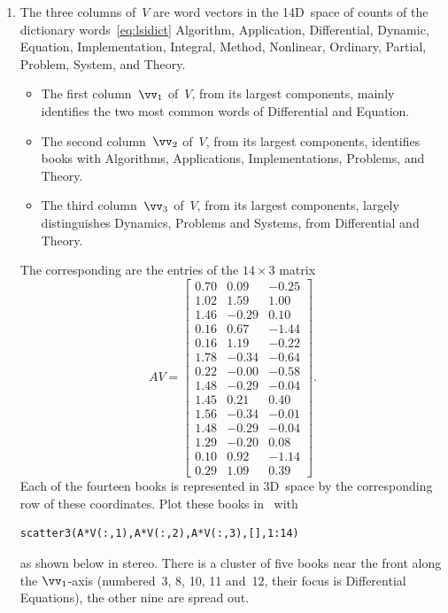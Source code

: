\begin{reduce}
\begin{enumerate}
\item The three  columns of~\(V\) are word vectors in the 14D~space of counts of the dictionary words~\eqref{eq:lsidict} Algorithm,
Application,
Differential,
Dynamic,
Equation,
Implementation,
Integral,
Method,
Nonlinear,
Ordinary,
Partial,
Problem,
System, and
Theory.
\begin{itemize}
\item The first column~\(\vv_1\) of~\(V\), from its largest components, mainly identifies the two most common words of Differential and Equation.
\item The second column~\(\vv_2\) of~\(V\), from its largest components, identifies books with Algorithms, Applications, Implementations, Problems, and Theory.
\item The third column~\(\vv_3\) of~\(V\), from its largest components, largely distinguishes Dynamics, Problems and Systems, from Differential and Theory.
\end{itemize}
The corresponding  are the entries of the \(14\times3\) matrix \twodp
\begin{equation*}
AV=\begin{bmatrix} 0.70 & 0.09 & -0.25
\\1.02 & 1.59 & 1.00
\\1.46 & -0.29 & 0.10
\\0.16 & 0.67 & -1.44
\\0.16 & 1.19 & -0.22
\\1.78 & -0.34 & -0.64
\\0.22 & -0.00 & -0.58
\\1.48 & -0.29 & -0.04
\\1.45 & 0.21 & 0.40
\\1.56 & -0.34 & -0.01
\\1.48 & -0.29 & -0.04
\\1.29 & -0.20 & 0.08
\\0.10 & 0.92 & -1.14
\\0.29 & 1.09 & 0.39 \end{bmatrix}.
\end{equation*}
Each of the fourteen books is represented in 3D~space by the corresponding row of these coordinates.
Plot these books in \script\ with 
\begin{verbatim}
scatter3(A*V(:,1),A*V(:,2),A*V(:,3),[],1:14)
\end{verbatim}
as shown below in stereo.
There is a cluster of five books near the front along the \(\vv_1\)-axis (numbered~3, 8, 10, 11 and~12, their focus is Differential Equations), the other nine are spread out.
\end{enumerate}




\end{reduce}
